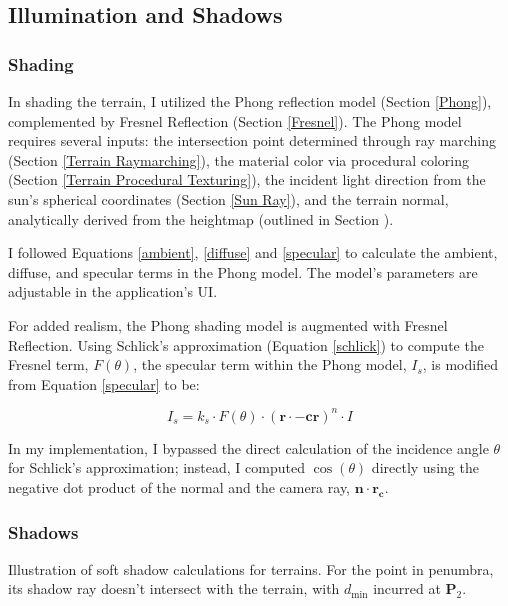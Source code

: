 \subsection{Illumination and Shadows}

\subsubsection{Shading}
\label{Terrain Shading}

In shading the terrain, I utilized the Phong reflection model (Section \ref{Phong}), complemented by Fresnel Reflection (Section \ref{Fresnel}). The Phong model requires several inputs: the intersection point determined through ray marching (Section \ref{Terrain Raymarching}), the material color via procedural coloring (Section \ref{Terrain Procedural Texturing}), the incident light direction from the sun's spherical coordinates (Section \ref{Sun Ray}), and the terrain normal, analytically derived from the heightmap (outlined in Section ).

I followed Equations \ref{ambient}, \ref{diffuse} and \ref{specular} to calculate the ambient, diffuse, and specular terms in the Phong model. The model's parameters are adjustable in the application's UI.

For added realism, the Phong shading model is augmented with Fresnel Reflection. Using Schlick's approximation (Equation \ref{schlick}) to compute the Fresnel term, $F(\theta)$, the specular term within the Phong model, $I_s$, is modified from Equation \ref{specular} to be:

\begin{equation}
I_{s} = k_s \cdot F(\theta) \cdot (\mathbf{r} \cdot \mathbf{-cr})^n \cdot I
\end{equation}

In my implementation, I bypassed the direct calculation of the incidence angle $\theta$ for Schlick's approximation; instead, I computed $\cos(\theta)$ directly using the negative dot product of the normal and the camera ray, $\mathbf{n} \cdot \mathbf{r_c}$.

\subsubsection{Shadows}
\label{Terrain Shadows}

{Illustration of soft shadow calculations for terrains. For the point in penumbra, its shadow ray doesn't intersect with the terrain, with $d_{\text{min}}$ incurred at $\mathbf{P}_2$.}{}

